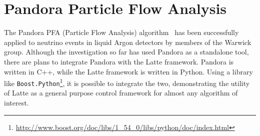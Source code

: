 \section{Pandora Particle Flow Analysis}
The Pandora PFA (Particle Flow Analysis) algorithm~\citep{Thomson2009} has been successfully applied to neutrino events in liquid Argon detectors by members of the Warwick group. Although the investigation so far has used Pandora as a standalone tool, there are plans to integrate Pandora with the Latte framework. Pandora is written in C++, while the Latte framework is written in Python. Using a library like \texttt{Boost.Python}\footnote{\url{http://www.boost.org/doc/libs/1_54_0/libs/python/doc/index.html}}, it is possible to integrate the two, demonstrating the utility of Latte as a general purpose control framework for almost any algorithm of interest.
